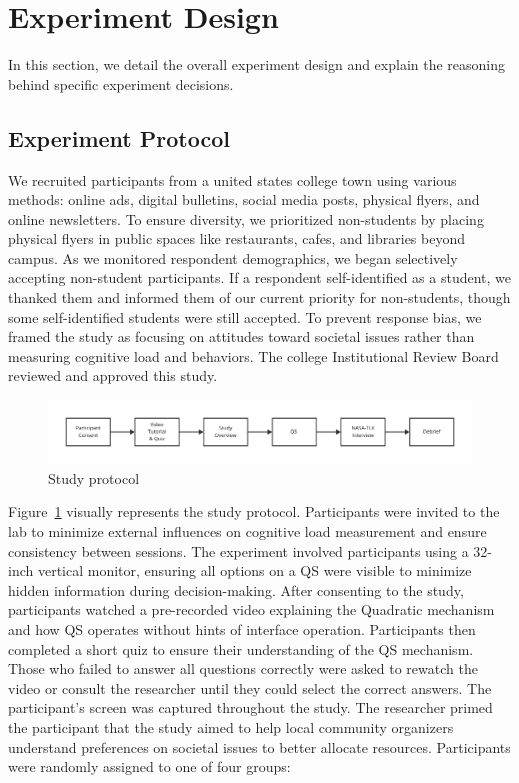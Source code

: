 \section{Experiment Design}
\label{sec:experiment}
In this section, we detail the overall experiment design and explain the reasoning behind specific experiment decisions.

\subsection{Experiment Protocol}
We recruited participants from a united states college town using various methods: online ads, digital bulletins, social media posts, physical flyers, and online newsletters. To ensure diversity, we prioritized non-students by placing physical flyers in public spaces like restaurants, cafes, and libraries beyond campus. As we monitored respondent demographics, we began selectively accepting non-student participants. If a respondent self-identified as a student, we thanked them and informed them of our current priority for non-students, though some self-identified students were still accepted. To prevent response bias, we framed the study as focusing on attitudes toward societal issues rather than measuring cognitive load and behaviors. The college Institutional Review Board reviewed and approved this study.

\begin{figure}[ht]
    \centering
    \includegraphics[width=1\textwidth]{content/image/study_flow.pdf}
    \caption{Study protocol}
    \label{fig:studyProtocol}
\end{figure}

Figure~\ref{fig:studyProtocol} visually represents the study protocol. Participants were invited to the lab to minimize external influences on cognitive load measurement and ensure consistency between sessions. The experiment involved participants using a 32-inch vertical monitor, ensuring all options on a QS were visible to minimize hidden information during decision-making. After consenting to the study, participants watched a pre-recorded video explaining the Quadratic mechanism and how QS operates without hints of interface operation. Participants then completed a short quiz to ensure their understanding of the QS mechanism. Those who failed to answer all questions correctly were asked to rewatch the video or consult the researcher until they could select the correct answers. The participant's screen was captured throughout the study. The researcher primed the participant that the study aimed to help local community organizers understand preferences on societal issues to better allocate resources. Participants were randomly assigned to one of four groups:

